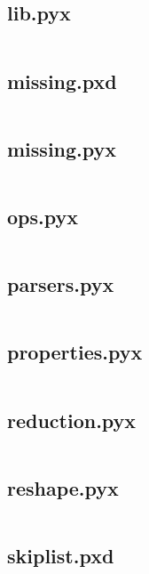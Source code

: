 \documentclass{article}
\begin{document}
\subsection{lib.pyx}
\inputminted{cython}{/home/dufferzafar/dev/@clones/pandas/pandas/_libs/lib.pyx}
\newpage

\subsection{missing.pxd}
\inputminted{cython}{/home/dufferzafar/dev/@clones/pandas/pandas/_libs/missing.pxd}
\newpage

\subsection{missing.pyx}
\inputminted{cython}{/home/dufferzafar/dev/@clones/pandas/pandas/_libs/missing.pyx}
\newpage

\subsection{ops.pyx}
\inputminted{cython}{/home/dufferzafar/dev/@clones/pandas/pandas/_libs/ops.pyx}
\newpage

\subsection{parsers.pyx}
\inputminted{cython}{/home/dufferzafar/dev/@clones/pandas/pandas/_libs/parsers.pyx}
\newpage

\subsection{properties.pyx}
\inputminted{cython}{/home/dufferzafar/dev/@clones/pandas/pandas/_libs/properties.pyx}
\newpage

\subsection{reduction.pyx}
\inputminted{cython}{/home/dufferzafar/dev/@clones/pandas/pandas/_libs/reduction.pyx}
\newpage

\subsection{reshape.pyx}
\inputminted{cython}{/home/dufferzafar/dev/@clones/pandas/pandas/_libs/reshape.pyx}
\newpage

\subsection{skiplist.pxd}
\inputminted{cython}{/home/dufferzafar/dev/@clones/pandas/pandas/_libs/skiplist.pxd}
\newpage
\end{document}
